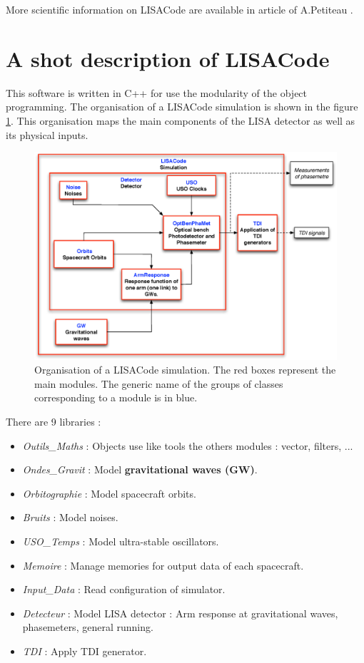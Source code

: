 \documentclass[a4paper,english,12pt]{article}
\begin{document}
More scientific information on LISACode are available in article of A.Petiteau \cite{LISACode}.

\section{A shot description of LISACode}
\label{SCode}
This software is written in C++ for use the modularity of the object programming. The organisation of a LISACode simulation is shown in the figure \ref{F:SimOrga}. This organisation maps the main components of the LISA detector as well as its physical inputs.

\begin{figure}[!h]
\centering \includegraphics[width=14cm]{Figures/SimOrga.eps}
\caption{\small Organisation of a LISACode simulation. The red boxes represent the main modules. The generic name of the groups of classes corresponding to a module is in blue.\small} 
\label{F:SimOrga}
\end{figure}

There are 9 libraries : 
\begin{itemize}
\item {\em Outils\_Maths} : Objects use like tools the others modules : vector, filters, ...
\item {\em Ondes\_Gravit} : Model \textbf{gravitational waves (GW)}.
\item {\em Orbitographie} : Model spacecraft orbits.
\item {\em Bruits} : Model noises.
\item {\em USO\_Temps} : Model ultra-stable oscillators.
\item {\em Memoire} : Manage memories for output data of each spacecraft.
\item {\em Input\_Data} : Read configuration of simulator.
\item {\em Detecteur} : Model LISA detector : Arm response at gravitational waves, phasemeters, general running.
\item {\em TDI} : Apply TDI generator.
\end{itemize}
\end{document}
